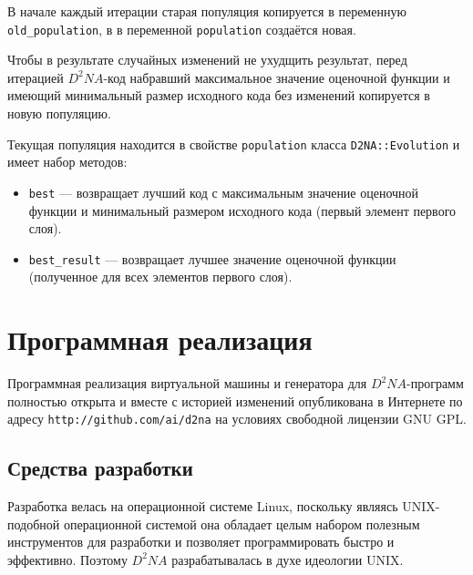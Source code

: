 \documentclass[utf8,a5paper,portrait,10pt,twoside]{eskdtext}
\begin{document}
В начале каждый итерации старая популяция копируется в переменную
\texttt{old\_population}, в в переменной \texttt{population} создаётся новая.

Чтобы в результате случайных изменений не ухудщить результат, перед итерацией
$D^2NA$-код набравший максимальное значение оценочной функции и имеющий
минимальный размер исходного кода без изменений копируется в новую популяцию.

Текущая популяция находится в свойстве \texttt{population} класса
\texttt{D2NA::Evolution} и имеет набор методов:
\begin{itemize}
  \item \texttt{best} — возвращает лучший код с максимальным значение оценочной
        функции и минимальный размером исходного кода (первый элемент первого
        слоя).
  \item \texttt{best\_result} — возвращает лучшее значение оценочной функции
        (полученное для всех элементов первого слоя).
\end{itemize}

\newpage
\section{Программная реализация}

Программная реализация виртуальной машины и генератора для $D^2NA$-программ
полностью открыта и  вместе с историей изменений опубликована в Интернете по
адресу \texttt{http://github.com/ai/d2na} на условиях свободной лицензии
GNU GPL.

\subsection{Средства разработки}

Разработка велась на операционной системе Linux, поскольку являясь UNIX-подобной
операционной системой она обладает целым набором полезным инструментов для
разработки и позволяет программировать быстро и эффективно. Поэтому $D^2NA$
разрабатывалась в духе идеологии UNIX.
\end{document}
